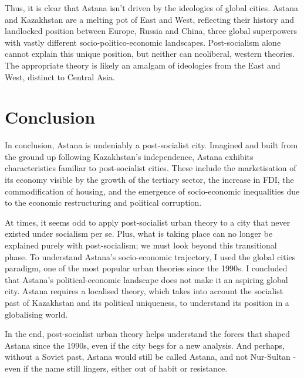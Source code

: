 \documentclass{article}
\begin{document}
Thus, it is clear that Astana isn't driven by the ideologies of global cities. Astana and Kazakhstan are a melting pot of East and West, reflecting their history and landlocked position between Europe, Russia and China, three global superpowers with vastly different socio-politico-economic landscapes. Post-socialism alone cannot explain this unique position, but neither can neoliberal, western theories. The appropriate theory is likely an amalgam of ideologies from the East and West, distinct to Central Asia.

\section{Conclusion}

In conclusion, Astana is undeniably a post-socialist city. Imagined and built from the ground up following Kazakhstan's independence, Astana exhibits characteristics familiar to post-socialist cities. These include the marketisation of its economy visible by the growth of the tertiary sector, the increase in FDI, the commodification of housing, and the emergence of socio-economic inequalities due to the economic restructuring and political corruption.

At times, it seems odd to apply post-socialist urban theory to a city that never existed under socialism per se. Plus, what is taking place can no longer be explained purely with post-socialism; we must look beyond this transitional phase.
To understand Astana's socio-economic trajectory, I used the global cities paradigm, one of the most popular urban theories since the 1990s. I concluded that Astana's political-economic landscape does not make it an aspiring global city.
Astana requires a localised theory, which takes into account the socialist past of Kazakhstan and its political uniqueness, to understand its position in a globalising world.

In the end, post-socialist urban theory helps understand the forces that shaped Astana since the 1990s, even if the city begs for a new analysis.
And perhaps, without a Soviet past, Astana would still be called Astana, and not Nur-Sultan - even if the name still lingers, either out of habit or resistance.

\end{document}

